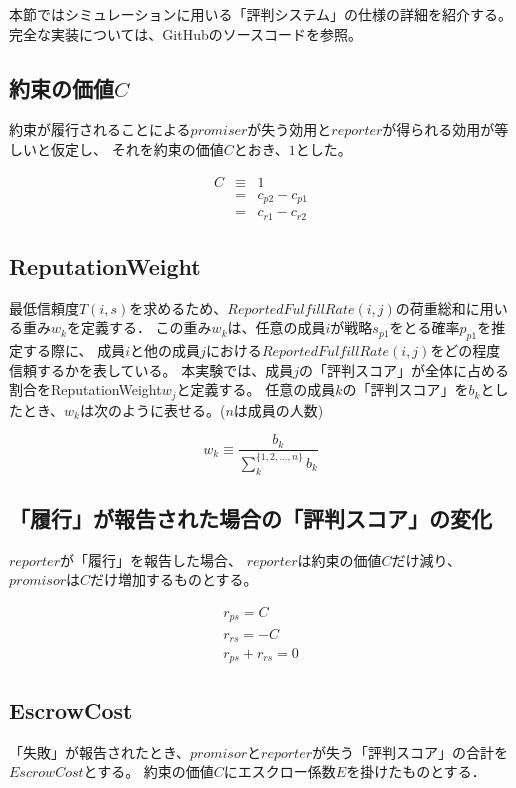 本節ではシミュレーションに用いる「評判システム」の仕様の詳細を紹介する。
完全な実装については、GitHubのソースコード\cite{mitamoto2021}を参照。

\subsection{約束の価値$C$}
約束が履行されることによる$promiser$が失う効用と$reporter$が得られる効用が等しいと仮定し、
それを約束の価値$C$とおき、$1$とした。

\begin{eqnarray}
  C &\equiv& 1 \\
    &=& c_{p2} - c_{p1} \\
    &=& c_{r1} - c_{r2}
\end{eqnarray}

\subsection{ReputationWeight}
最低信頼度$T(i, s)$を求めるため、$ReportedFulfillRate(i, j)$の荷重総和に用いる重み$w_k$を定義する．
この重み$w_k$は、任意の成員$i$が戦略$s_{p1}$をとる確率$p_{p1}$を推定する際に、
成員$i$と他の成員$j$における$ReportedFulfillRate(i, j)$をどの程度信頼するかを表している。
本実験では、成員$j$の「評判スコア」が全体に占める割合をReputationWeight$w_j$と定義する。
任意の成員$k$の「評判スコア」を$b_k$としたとき、$w_k$は次のように表せる。($n$は成員の人数)

\begin{equation*}
  w_k \equiv \frac{b_k}{\sum^{\{1,2,...,n\}}_{k}b_k}
\end{equation*}

\subsection{「履行」が報告された場合の「評判スコア」の変化}
$ reporter $が「履行」を報告した場合、
$ reporter $は約束の価値$C$だけ減り、$ promisor $は$C$だけ増加するものとする。

\begin{gather}
  r_{ps} = C \\
  r_{rs} = -C \\
  r_{ps} + r_{rs} = 0
\end{gather}


\subsection{EscrowCost}
「失敗」が報告されたとき、$promisor$と$reporter$が失う「評判スコア」の合計を$EscrowCost$とする。
約束の価値$C$にエスクロー係数$E$を掛けたものとする．

